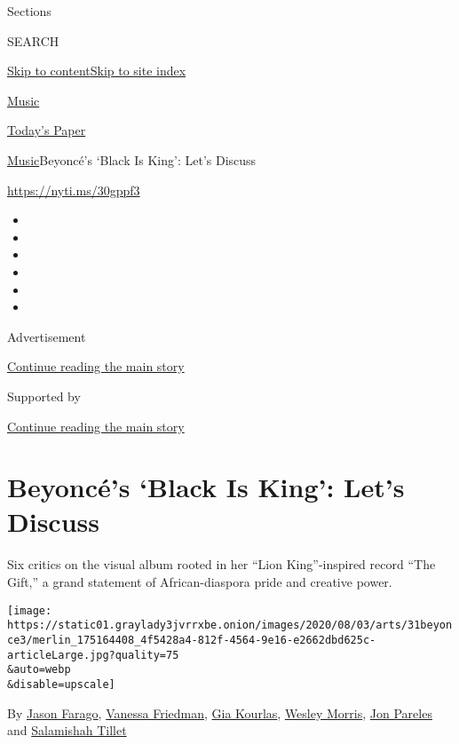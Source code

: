 Sections

SEARCH

\protect\hyperlink{site-content}{Skip to
content}\protect\hyperlink{site-index}{Skip to site index}

\href{https://www.nytimes3xbfgragh.onion/section/arts/music}{Music}

\href{https://myaccount.nytimes3xbfgragh.onion/auth/login?response_type=cookie\&client_id=vi}{}

\href{https://www.nytimes3xbfgragh.onion/section/todayspaper}{Today's
Paper}

\href{/section/arts/music}{Music}\textbar{}Beyoncé's `Black Is King':
Let's Discuss

\url{https://nyti.ms/30gppf3}

\begin{itemize}
\item
\item
\item
\item
\item
\item
\end{itemize}

Advertisement

\protect\hyperlink{after-top}{Continue reading the main story}

Supported by

\protect\hyperlink{after-sponsor}{Continue reading the main story}

\hypertarget{beyoncuxe9s-black-is-king-lets-discuss}{%
\section{Beyoncé's `Black Is King': Let's
Discuss}\label{beyoncuxe9s-black-is-king-lets-discuss}}

Six critics on the visual album rooted in her ``Lion King''-inspired
record ``The Gift,'' a grand statement of African-diaspora pride and
creative power.

\texttt{[image: https://static01.graylady3jvrrxbe.onion/images/2020/08/03/arts/31beyonce3/merlin\_175164408\_4f5428a4-812f-4564-9e16-e2662dbd625c-articleLarge.jpg?quality=75\\\&auto=webp\\\&disable=upscale]}

By \href{https://www.nytimes3xbfgragh.onion/by/jason-farago}{Jason
Farago},
\href{https://www.nytimes3xbfgragh.onion/by/vanessa-friedman}{Vanessa
Friedman}, \href{https://www.nytimes3xbfgragh.onion/by/gia-kourlas}{Gia
Kourlas},
\href{https://www.nytimes3xbfgragh.onion/by/wesley-morris}{Wesley
Morris}, \href{https://www.nytimes3xbfgragh.onion/by/jon-pareles}{Jon
Pareles} and
\href{https://www.nytimes3xbfgragh.onion/by/salamishah-tillet}{Salamishah
Tillet}

